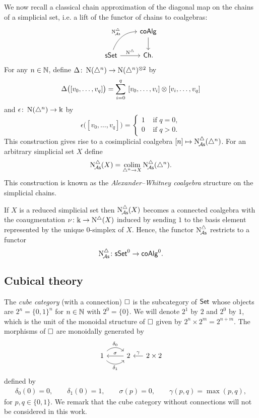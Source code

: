 We now recall a classical chain approximation of the diagonal map on the chains of a simplicial set, i.e. a lift of the functor of chains to coalgebras:
\[
\begin{tikzcd}
	& \coAlg \arrow[d] \\
	\sSet \arrow[r, "\schains"] \arrow[ur, "\schainsA", out=70, in=180] & \Ch.
\end{tikzcd}
\]
 For any $n \in \mathbb{N}$, define $\Delta \colon \operatorname{N}(\triangle^n) \to \operatorname{N}(\triangle^n)^{\otimes2}$ by
\[
\Delta \big( [v_0, \dots, v_q] \big) = \sum_{i=0}^q \ [v_0, \dots, v_i] \otimes [v_i, \dots, v_q]
\]
and $\epsilon \colon \operatorname{N}(\triangle^n) \to \Bbbk$ by
\[
\epsilon \big( [v_0, \dots, v_q] \big) = \begin{cases} 1 & \text{ if } q = 0, \\ 0 & \text{ if } q>0. \end{cases}
\] This construction gives rise to a cosimplicial coalgebra $[n] \mapsto \operatorname{N^{\triangle}_{\!{\mathcal{A}\mathsf{s}}}}(\triangle^n)$. For an arbitrary simplicial set $X$ define
\[
\operatorname{N^{\triangle}_{\!{\mathcal{A}\mathsf{s}}}}(X) = \operatorname*{colim}_{\triangle^n \to X} \operatorname{N^{\triangle}_{\!{\mathcal{A}\mathsf{s}}}}(\triangle^n).
\]
This construction is known as the \textit{Alexander--Whitney coalgebra} structure on the simplicial chains.

If $X$ is a reduced simplicial set then $\operatorname{N^{\triangle}_{\!{\mathcal{A}\mathsf{s}}}}(X)$ becomes a connected coalgebra with the coaugmentation $\nu \colon \Bbbk \to \operatorname{N^{\triangle}}(X)$ induced by sending $1$ to the basis element represented by the unique $0$-simplex of $X$.
Hence, the functor $\operatorname{N^{\triangle}_{\!{\mathcal{A}\mathsf{s}}}}$ restricts to a functor
\[
\operatorname{N^{\triangle}_{\!{\mathcal{A}\mathsf{s}}}} \colon \mathsf{sSet}^0 \to \mathsf{coAlg}^0.
\]

\subsection{Cubical theory}\label{ss:cubical}

The \textit{cube category} (with a connection) $\square$ is the subcategory of $\mathsf{Set}$ whose objects are $2^n = \{0, 1\}^n$ for $n \in \mathbb{N}$ with $2^0 = \{0\}$.
We will denote $2^1$ by $2$ and $2^0$ by $1$, which is the unit of the monoidal structure of $\square$ given by $2^n \times 2^m = 2^{n+m}$.
The morphisms of $\square$ are monoidally generated by
\begin{equation}\label{eq:cube generators}
	\begin{tikzcd}
		1 \arrow[r, out=45, in=135, "\delta_0"] \arrow[r, out=-45, in=-135, "\delta_1"'] & 2 \arrow[l, "\sigma"'] &[-10pt] \arrow[l, "\gamma"'] 2 \times 2
	\end{tikzcd}
\end{equation}
defined by
\begin{gather*}
	\delta_0(0) = 0, \qquad
	\delta_1(0) = 1, \qquad
	\sigma(p) = 0, \qquad
	\gamma(p,q) = \max(p,q),
\end{gather*}
for $p,q \in \{0,1\}$.
We remark that the cube category without connections will not be considered in this work.

